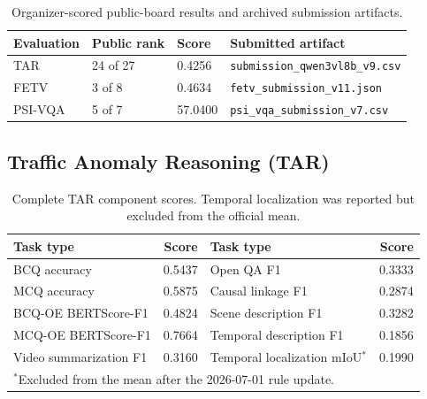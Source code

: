 \documentclass[runningheads]{llncs}
\begin{document}
\begin{table}[!ht]
\caption{Organizer-scored public-board results and archived submission artifacts.}
\label{tab:overall}
\centering
\small
\begin{tabularx}{\textwidth}{@{}L{0.14\textwidth}L{0.15\textwidth}L{0.13\textwidth}Y@{}}
\toprule
Evaluation & Public rank & Score & Submitted artifact \\
\midrule
TAR & 24 of 27 & 0.4256 & \texttt{submission\_qwen3vl8b\_v9.csv} \\
FETV & 3 of 8 & 0.4634 & \texttt{fetv\_submission\_v11.json} \\
PSI-VQA & 5 of 7 & 57.0400 & \texttt{psi\_vqa\_submission\_v7.csv} \\
\bottomrule
\end{tabularx}
\end{table}

\subsection{Traffic Anomaly Reasoning (TAR)}

\begin{table}[t]
\caption{Complete TAR component scores. Temporal localization was reported but excluded from the official mean.}
\label{tab:tar}
\centering
\small
\begin{tabular}{@{}lr@{\qquad}lr@{}}
\toprule
Task type & Score & Task type & Score \\
\midrule
BCQ accuracy & 0.5437 & Open QA F1 & 0.3333 \\
MCQ accuracy & 0.5875 & Causal linkage F1 & 0.2874 \\
BCQ-OE BERTScore-F1 & 0.4824 & Scene description F1 & 0.3282 \\
MCQ-OE BERTScore-F1 & 0.7664 & Temporal description F1 & 0.1856 \\
Video summarization F1 & 0.3160 & Temporal localization mIoU$^*$ & 0.1990 \\
\bottomrule
\multicolumn{4}{l}{\scriptsize $^*$Excluded from the mean after the 2026-07-01 rule update.}
\end{tabular}
\end{table}
\end{document}
